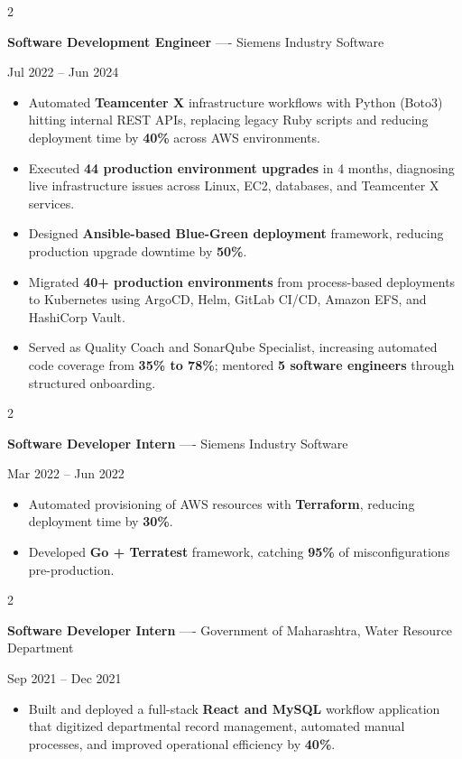 \documentclass[10pt, letterpaper]{article}
\newenvironment{highlights}{
    \begin{itemize}[
        topsep=0.10 cm,
        parsep=0.06 cm,
        partopsep=0pt,
        itemsep=0.06 cm,
        leftmargin=12pt
    ]
}{
    \end{itemize}
}
\newenvironment{twocolentry}[2][]{
    \onecolentry
    \def\secondColumn{#2}
    \setcolumnwidth{\fill, 4.5 cm}
    \begin{paracol}{2}
}{
    \switchcolumn \raggedleft \secondColumn
    \end{paracol}
    \endonecolentry
}
\begin{document}
\vspace{0.15 cm}

\begin{twocolentry}{Jul 2022 -- Jun 2024}
\textbf{Software Development Engineer} ---- Siemens Industry Software
\end{twocolentry}
\begin{highlights}
  \item Automated \textbf{Teamcenter X} infrastructure workflows with Python (Boto3) hitting internal REST APIs, replacing legacy Ruby scripts and reducing deployment time by \textbf{40\%} across AWS environments.
  \item Executed \textbf{44 production environment upgrades} in 4 months, diagnosing live infrastructure issues across Linux, EC2, databases, and Teamcenter X services.
  \item Designed \textbf{Ansible-based Blue-Green deployment} framework, reducing production upgrade downtime by \textbf{50\%}.
  \item Migrated \textbf{40+ production environments} from process-based deployments to Kubernetes using ArgoCD, Helm, GitLab CI/CD, Amazon EFS, and HashiCorp Vault.
  \item Served as Quality Coach and SonarQube Specialist, increasing automated code coverage from \textbf{35\% to 78\%}; mentored \textbf{5 software engineers} through structured onboarding.
\end{highlights}

\vspace{0.15 cm}

\begin{twocolentry}{Mar 2022 -- Jun 2022}
\textbf{Software Developer Intern} ---- Siemens Industry Software
\end{twocolentry}
\begin{highlights}
  \item Automated provisioning of AWS resources with \textbf{Terraform}, reducing deployment time by \textbf{30\%}.
  \item Developed \textbf{Go + Terratest} framework, catching \textbf{95\%} of misconfigurations pre-production.
\end{highlights}

\vspace{0.15 cm}

\begin{twocolentry}{Sep 2021 -- Dec 2021}
\textbf{Software Developer Intern} ---- Government of Maharashtra, Water Resource Department
\end{twocolentry}
\begin{highlights}
  \item Built and deployed a full-stack \textbf{React and MySQL} workflow application that digitized departmental record management, automated manual processes, and improved operational efficiency by \textbf{40\%}.
\end{highlights}
\end{document}
